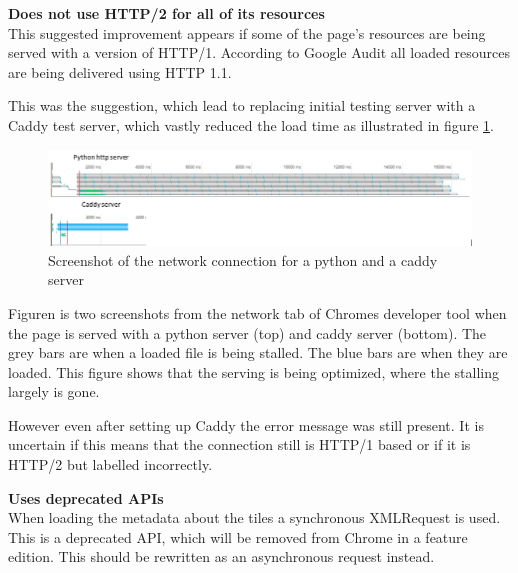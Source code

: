 \textbf{Does not use HTTP/2 for all of its resources}\\
This suggested improvement appears if some of the page’s resources are being served with a version of HTTP/1. According to Google Audit all loaded resources are being delivered using HTTP 1.1.
\citep{HTTP2}

This was the suggestion, which lead to replacing initial testing server with a Caddy test server, which vastly reduced the load time as illustrated in figure \ref{CaddyVsPython}.

\begin{figure} [H]
	\centering
	\includegraphics[width=1\textwidth]{Pictures/CaddyVsPython}
	\caption{Screenshot of the network connection for a python and a caddy server}
	\label{CaddyVsPython}
\end{figure}

Figuren is two screenshots from the network tab of Chromes developer tool when the page is served with a python server (top) and caddy server (bottom). 
The grey bars are when a loaded file is being stalled. The blue bars are when they are loaded. This figure shows that the serving is being optimized, where the stalling largely is gone. 

However even after setting up Caddy the error message was still present. It is uncertain if this means that the connection still is HTTP/1 based or if it is HTTP/2 but labelled incorrectly. 








\textbf{Uses deprecated APIs}\\
When loading the metadata about the tiles a synchronous XMLRequest is used. This is a deprecated API, which will be removed from Chrome in a feature edition. This should be rewritten as an asynchronous request instead.
\citep{OldApis}


